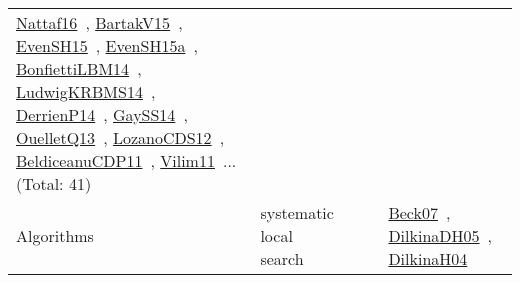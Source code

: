 {\begin{longtable}{lp{3cm}>{\raggedright\arraybackslash}p{6cm}>{\raggedright\arraybackslash}p{6cm}>{\raggedright\arraybackslash}p{8cm}}
\href{../works/Nattaf16.pdf}{Nattaf16}~\cite{Nattaf16}, \href{../works/BartakV15.pdf}{BartakV15}~\cite{BartakV15}, \href{../works/EvenSH15.pdf}{EvenSH15}~\cite{EvenSH15}, \href{../works/EvenSH15a.pdf}{EvenSH15a}~\cite{EvenSH15a}, \href{../works/BonfiettiLBM14.pdf}{BonfiettiLBM14}~\cite{BonfiettiLBM14}, \href{../works/LudwigKRBMS14.pdf}{LudwigKRBMS14}~\cite{LudwigKRBMS14}, \href{../works/DerrienP14.pdf}{DerrienP14}~\cite{DerrienP14}, \href{../works/GaySS14.pdf}{GaySS14}~\cite{GaySS14}, \href{../works/OuelletQ13.pdf}{OuelletQ13}~\cite{OuelletQ13}, \href{../works/LozanoCDS12.pdf}{LozanoCDS12}~\cite{LozanoCDS12}, \href{../works/BeldiceanuCDP11.pdf}{BeldiceanuCDP11}~\cite{BeldiceanuCDP11}, \href{../works/Vilim11.pdf}{Vilim11}~\cite{Vilim11}... (Total: 41)\\
Algorithms & systematic local search &  &  & \href{../works/Beck07.pdf}{Beck07}~\cite{Beck07}, \href{../works/DilkinaDH05.pdf}{DilkinaDH05}~\cite{DilkinaDH05}, \href{../works/DilkinaH04.pdf}{DilkinaH04}~\cite{DilkinaH04}\\

\end{longtable}}
